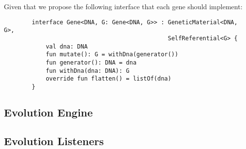       Given that we propose the following interface that each gene should
      implement:

      \begin{verbatim}
        interface Gene<DNA, G: Gene<DNA, G>> : GeneticMaterial<DNA, G>, 
                                               SelfReferential<G> {
            val dna: DNA
            fun mutate(): G = withDna(generator())
            fun generator(): DNA = dna
            fun withDna(dna: DNA): G
            override fun flatten() = listOf(dna)
        }
      \end{verbatim}

  \subsection{Evolution Engine}
  \label{sec:keen:ga:engine}
    \Blindtext
  \subsection{Evolution Listeners}
  \label{sec:keen:ga:listeners}
    \Blindtext
